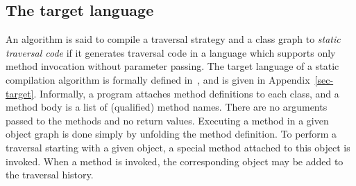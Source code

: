 \subsection{The target language}
An algorithm is said to compile a traversal strategy and a class graph
to {\em static traversal code} if it generates traversal code in a
language which supports only method invocation without parameter
passing.  The target language of a static compilation algorithm is
formally defined in~\cite{lieber-palsberg-xiao94,
gener-comp-j:jens-boaz-karl}, and is given in
Appendix~\ref{sec-target}.  Informally, a program attaches method
definitions to each class, and a method body is a list of (qualified)
method names. There are no arguments passed to the methods and no
return values.  Executing a method in a given object graph is done
simply by unfolding the method definition. To perform a traversal
starting with a given object, a special method attached to this object
is invoked. When a method is invoked, the corresponding object may be
added to the traversal history.

